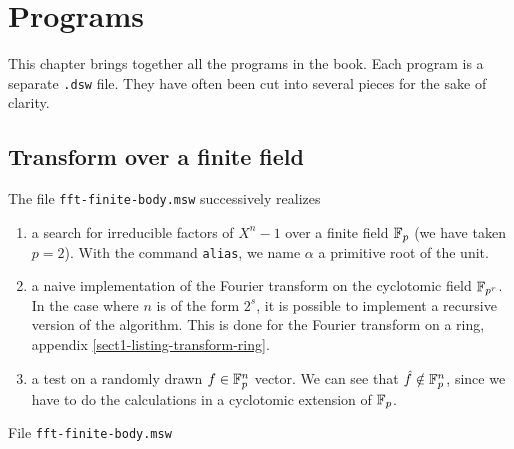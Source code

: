  
\chapter{Programs \Maple{}}
\label{appendix-software-resources}
 
 This chapter brings together all the \Maple{} programs in the book. Each program is a separate \texttt{.dsw} file. They have often been cut into several pieces for the sake of clarity.

\section{Transform over a finite field}
\label{sect1-listing-transform-finite-body}
 
 The file \texttt{fft-finite-body.msw} successively realizes \begin{enumerate}
\item a search for irreducible factors of $ X^n-1 $ over a finite field $ \mathbb{F}_p $ (we have taken $ p = 2 $). With the command \texttt{alias}, we name $ \alpha $ a primitive root of the unit.
\item a naive implementation of the Fourier transform on the cyclotomic field $ \mathbb{F}_{p^r} $. In the case where $ n $ is of the form $ 2^s $, it is possible to implement a recursive version of the algorithm. This is done for the Fourier transform on a ring, appendix \ref{sect1-listing-transform-ring}.
\item a test on a randomly drawn $ f \in \mathbb{F}_p^n $ vector. We can see that $ \hat{f} \notin \mathbb{F}_p^n $, since we have to do the calculations in a cyclotomic extension of $ \mathbb{F}_p $.
\end{enumerate}
\begin{listing} \begin{footnotesize}

\end{footnotesize}
 
\caption{File \texttt{fft-finite-body.msw}}
 
\label{listing-fft-finite-body}
\end{listing}
 
